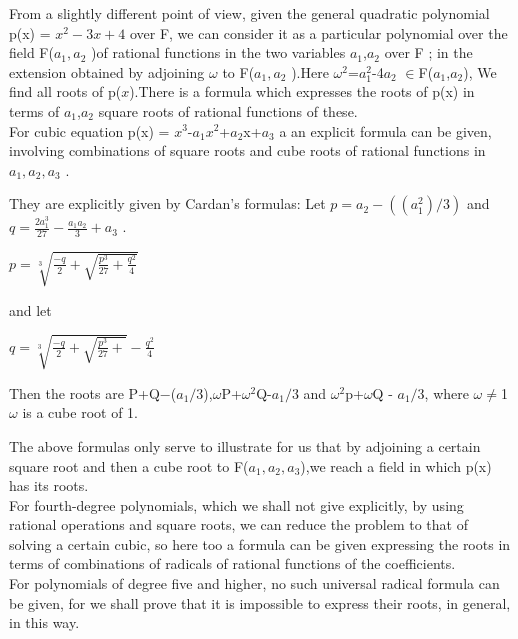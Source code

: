 \documentclass[12pt]{article}
\theoremstyle{definition}
\theoremstyle{remark}
\begin{document}
From a slightly different point of view, given the general quadratic polynomial
p(x) = $x^{2}-3x+4$ over F, we can consider it as a particular polynomial over the field F($a_{1},a_{2}$ )of rational functions in the two variables $a_{1}$,$a_{2}$ over F ; in the extension obtained by adjoining $\omega$
to F($a_{1},a_{2}$ ).Here  $\omega^{2}$=$a_{1}^{2}$-4$a_{2}$ $\in$F($a_{1}$,$a_{2}$), We find all roots of p($x$).There is a formula which expresses the roots of p(x) in terms of $a_{1}$,$a_{2}$ square roots of rational
functions of these.\\For cubic equation p(x) = $x^{3}$-$a_{1}x^{2}$+$a_{2}$x+$a_{3}$ a an explicit formula can be given, involving combinations of square roots and cube roots of rational functions in $a_{1},a_{2},a_{3}$ .

They are explicitly given by Cardan's formulas: Let $p = a_{2}-((a_{1}^{2})/3)$ and $q=\frac{2a_{1}^{3}}{27}-\frac{a_{1}a_{2}}{3}+a_{3}$ .\\
   \begin{center}
    $p=\sqrt[3]{\frac{-q}{2}+\sqrt{\frac{p^{3}}{27}+\frac{q^{2}}{4}}}$
   \end{center}
    and let
    \begin{center}
    $q=\sqrt[3]{\frac{-q}{2}+\sqrt{\frac{p^{3}}{27}+}}-\frac{q^{2}}{4}$
    \end{center}
Then the roots are P+Q$-$($a_{1}/3$),$\omega$P+$\omega^{2}$Q-$a_{1}/3$
and $\omega^{2}$p+$\omega$Q - $a_{1}/3$, where $\omega\neq$1 $\omega$ is a cube root of 1.

The above formulas only serve to illustrate for us that by adjoining a certain square root and then a cube root to F($a_{1},a_{2},a_{3}$),we reach a field in which p(x) has its roots.\\For fourth-degree polynomials, which we shall not give explicitly, by using rational operations and square roots, we can reduce the problem to that of solving a certain cubic, so here too a formula can be given expressing the roots in terms of combinations of radicals of rational
functions of the coefficients.\\For polynomials of degree five and higher, no such universal radical formula can be given, for we shall prove that it is impossible to express their roots, in general, in this way.
\end{document}
